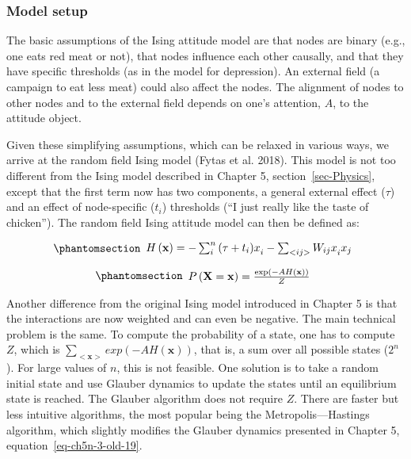 \documentclass[
  a4paper,
  DIV=11,
  numbers=noendperiod,
  oneside]{scrreprt}
\begin{document}
\subsubsection{Model setup}\label{sec-Model-setup}

The basic assumptions of the Ising attitude model are that nodes are
binary (e.g., one eats red meat or not), that nodes influence each other
causally, and that they have specific thresholds (as in the model for
depression). An external field (a campaign to eat less meat) could also
affect the nodes. The alignment of nodes to other nodes and to the
external field depends on one's attention, \(A\), to the attitude
object.

Given these simplifying assumptions, which can be relaxed in various
ways, we arrive at the random field Ising model (Fytas et al. 2018).
This model is not too different from the Ising model described in
Chapter 5, section~\ref{sec-Physics}, except that the first term now has
two components, a general external effect (\(\tau\)) and an effect of
node-specific (\(t_{i}\)) thresholds (``I just really like the taste of
chicken''). The random field Ising attitude model can then be defined
as:

\begin{equation}\phantomsection\label{eq-ch6-4-old-45}{\begin{array}{r}
H\left( \mathbf{x} \right) = - \sum_{i}^{n}{(\tau + {t_{i})x}_{i}} - \sum_{<ij>}^{}{{W_{ij}x}_{i}x_{j}}
\end{array}}\end{equation}

\begin{equation}\phantomsection\label{eq-ch6-5-old-46}{\begin{array}{r}
P\left( \mathbf{X} = \mathbf{x} \right) = \frac{\exp\left( - AH\left( \mathbf{x} \right) \right)}{Z}
\end{array}}\end{equation}

Another difference from the original Ising model introduced in Chapter 5
is that the interactions are now weighted and can even be negative. The
main technical problem is the same. To compute the probability of a
state, one has to compute \(Z\), which is
\(\sum_{< \mathbf{x} >}^{}{exp(- AH\left( \mathbf{x} \right))}\), that
is, a sum over all possible states (\(2^{n}\)). For large values of
\(n\), this is not feasible. One solution is to take a random initial
state and use Glauber dynamics to update the states until an equilibrium
state is reached. The Glauber algorithm does not require \(Z\). There
are faster but less intuitive algorithms, the most popular being the
Metropolis---Hastings algorithm, which slightly modifies the Glauber
dynamics presented in Chapter 5, equation~\ref{eq-ch5n-3-old-19}.
\end{document}
